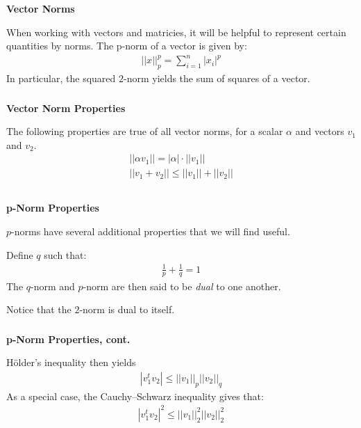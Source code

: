 \begin{frame}[fragile] \frametitle{}

{\bf Vector Norms}

When working with vectors and matricies, it will be helpful
to represent certain quantities by norms. The p-norm of a
vector is given by:
\begin{align*}
||x||_p^p = \sum_{i=1}^n | x_i |^p
\end{align*}
\pause In particular, the squared $2$-norm yields the sum
of squares of a vector.

\end{frame}

\begin{frame}[fragile] \frametitle{}

{\bf Vector Norm Properties}

The following properties are true of all vector norms,
for a scalar $\alpha$ and vectors $v_1$ and $v_2$.
\begin{align*}
|| \alpha v_1 || = |\alpha| \cdot || v_1 || \\
|| v_1 + v_2 || \leq || v_1 || + || v_2 || \\
\end{align*}

\end{frame}

\begin{frame}[fragile] \frametitle{}

{\bf p-Norm Properties}

$p$-norms have several additional properties that we will find
useful.

\pause Define $q$ such that:
\begin{align*}
\frac{1}{p} + \frac{1}{q} = 1
\end{align*}
The $q$-norm and $p$-norm are then said to be {\it dual} to one another.

\pause Notice that the $2$-norm is dual to itself.

\end{frame}

\begin{frame}[fragile] \frametitle{}

{\bf p-Norm Properties, cont.}

Hölder's inequality then yields
\begin{align*}
| v_1^t v_2 | \leq ||v_1||_p ||v_2||_q
\end{align*}
\pause As a special case, the Cauchy–Schwarz inequality
gives that:
\begin{align*}
| v_1^t v_2 |^2 \leq ||v_1||_2^2 ||v_2||_2^2
\end{align*}

\end{frame}


